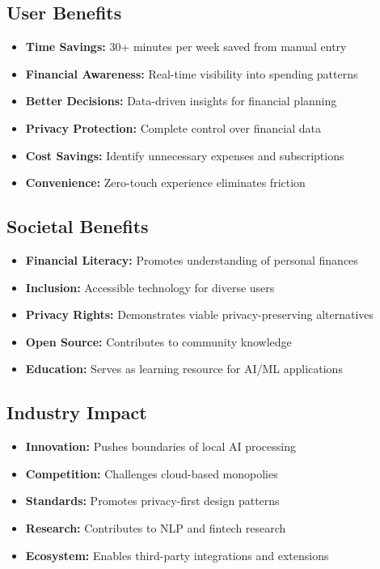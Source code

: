 \documentclass[11pt,a4paper]{report}
\begin{document}
\begin{itemize}
\subsection{User Benefits}

\begin{itemize}
    \item \textbf{Time Savings:} 30+ minutes per week saved from manual entry
    \item \textbf{Financial Awareness:} Real-time visibility into spending patterns
    \item \textbf{Better Decisions:} Data-driven insights for financial planning
    \item \textbf{Privacy Protection:} Complete control over financial data
    \item \textbf{Cost Savings:} Identify unnecessary expenses and subscriptions
    \item \textbf{Convenience:} Zero-touch experience eliminates friction
\end{itemize}

\subsection{Societal Benefits}

\begin{itemize}
    \item \textbf{Financial Literacy:} Promotes understanding of personal finances
    \item \textbf{Inclusion:} Accessible technology for diverse users
    \item \textbf{Privacy Rights:} Demonstrates viable privacy-preserving alternatives
    \item \textbf{Open Source:} Contributes to community knowledge
    \item \textbf{Education:} Serves as learning resource for AI/ML applications
\end{itemize}

\subsection{Industry Impact}

\begin{itemize}
    \item \textbf{Innovation:} Pushes boundaries of local AI processing
    \item \textbf{Competition:} Challenges cloud-based monopolies
    \item \textbf{Standards:} Promotes privacy-first design patterns
    \item \textbf{Research:} Contributes to NLP and fintech research
    \item \textbf{Ecosystem:} Enables third-party integrations and extensions
\end{itemize}


\end{itemize}
\end{document}
